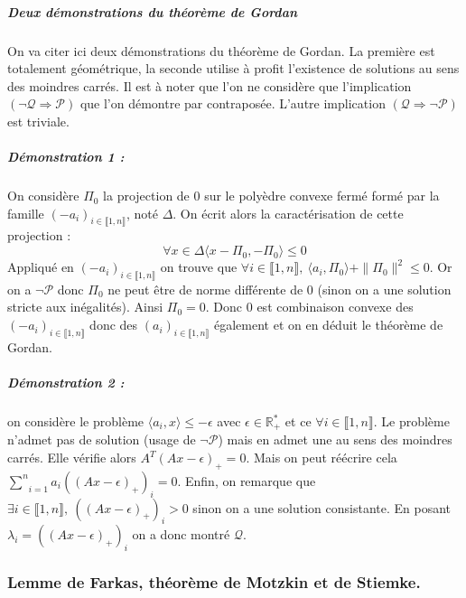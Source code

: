 \documentclass[10pt,a4paper]{article}
\begin{document}
\subparagraph{Deux démonstrations du théorème de Gordan}
On va citer ici deux démonstrations du théorème de Gordan.
La première est totalement géométrique, la seconde utilise à profit l'existence de solutions au sens des moindres carrés.
Il est à noter que l'on ne considère que l'implication $(\neg \mathcal{Q} \Rightarrow \mathcal{P})$ que l'on démontre par contraposée.
L'autre implication $(\mathcal{Q} \Rightarrow \neg \mathcal{P})$ est triviale.
\subparagraph{Démonstration 1 :} On considère $\Pi_0$ la projection de $0$ sur le polyèdre convexe fermé formé par la famille $(-a_i)_{i \in \llbracket 1,n \rrbracket}$, noté $\Delta$.
On écrit alors la caractérisation de cette projection :
\begin{equation}
\forall x \in \Delta \langle x- \Pi_0,-\Pi_0 \rangle \le 0
\end{equation}
Appliqué en $(-a_i)_{i \in \llbracket 1,n \rrbracket}$ on trouve que $\forall i \in \llbracket 1,n \rrbracket, \ \langle a_i, \Pi_0 \rangle + \| \Pi_0 \|^2 \le 0$.
Or on a $\neg \mathcal{P}$ donc $\Pi_0$ ne peut être de norme différente de $0$ (sinon on a une solution stricte aux inégalités).
Ainsi $\Pi_0=0$.
Donc $0$ est combinaison convexe des $(-a_i)_{i \in \llbracket 1,n \rrbracket}$ donc des $(a_i)_{i \in \llbracket 1,n \rrbracket}$ également et on en déduit le théorème de Gordan.
\subparagraph{Démonstration 2 :} on considère le problème $\langle a_i, x \rangle \le -\epsilon$ avec $\epsilon \in \mathbb{R}_+^*$ et ce $\forall i \in \llbracket 1,n \rrbracket$.
Le problème n'admet pas de solution (usage de $\neg \mathcal{P}$) mais en admet une au sens des moindres carrés.
Elle vérifie alors $A^T(Ax-\epsilon)_+=0$.
Mais on peut réécrire cela $\underset{i=1}{\overset{n}{\sum}}a_i ((Ax-\epsilon)_+)_i=0$.
Enfin, on remarque que $\exists i \in \llbracket 1,n \rrbracket, \ ((Ax-\epsilon)_+)_i>0$ sinon on a une solution consistante.
En posant $\lambda_i=((Ax-\epsilon)_+)_i$ on a donc montré $\mathcal{Q}$.

\subsubsection{Lemme de Farkas, théorème de Motzkin et de Stiemke.}
\end{document}
